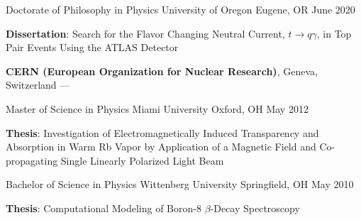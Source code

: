 
\begin{cventries}
  \cventry
    {Doctorate of Philosophy in Physics} %
    {University of Oregon} %
    {Eugene, OR} %
    {June 2020} %
    {
      \begin{cvitems} %
         \item {\textbf{Dissertation}: Search for the Flavor Changing Neutral Current, $t\rightarrow q \gamma$, in Top Pair Events Using the ATLAS Detector}
         \vspace{0.5mm}
         \item {\textbf{CERN (European Organization for Nuclear Research)}, Geneva, Switzerland --- }
      \end{cvitems}
    }

      \cventry
    {Master of Science in Physics} %
    {Miami University} %
    {Oxford, OH} %
    {May 2012} %
    {
      \begin{cvitems} %
         \item {\textbf{Thesis}: Investigation of Electromagnetically Induced Transparency and Absorption in Warm Rb Vapor by Application of a Magnetic Field and Co-propagating Single Linearly Polarized Light Beam}
      \end{cvitems}
    }    
    
      \cventry
    {Bachelor of Science in Physics} %
    {Wittenberg University} %
    {Springfield, OH} %
    {May 2010} %
    {
      \begin{cvitems} %
         \item {\textbf{Thesis}: Computational Modeling of Boron-8 $\beta$-Decay Spectroscopy}
      \end{cvitems}
    }
\end{cventries}
